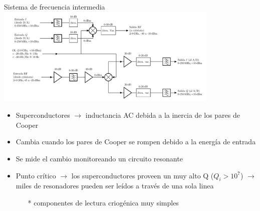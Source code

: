 \documentclass[ignorenonframetext,12pt]{beamer}
\begin{document}
\begin{frame}{Sistema de frecuencia intermedia}
	\centering
	\qquad \includegraphics[width=0.8\textwidth]{c3_if_bloques_mio}
	\begin{itemize}
		\item \footnotesize{Superconductores $\to$ inductancia AC debida a la
			inercia de los pares de Cooper}
		\item Cambia cuando los pares de Cooper se rompen debido a la
			energía de entrada
		\item Se mide el cambio monitoreando un circuito resonante
		\item Punto crítico $\to$ los \alert{superconductores proveen un muy
			alto Q} ($Q_i > 10^7$) $\to$ miles de resonadores
			pueden ser leídos a través de una sola linea 
			\begin{itemize}
				\item[*] \scriptsize{{\color{blue}componentes de lectura criogénica muy
					simples}}
			\end{itemize}
	\end{itemize}
\end{frame}
\end{document}
